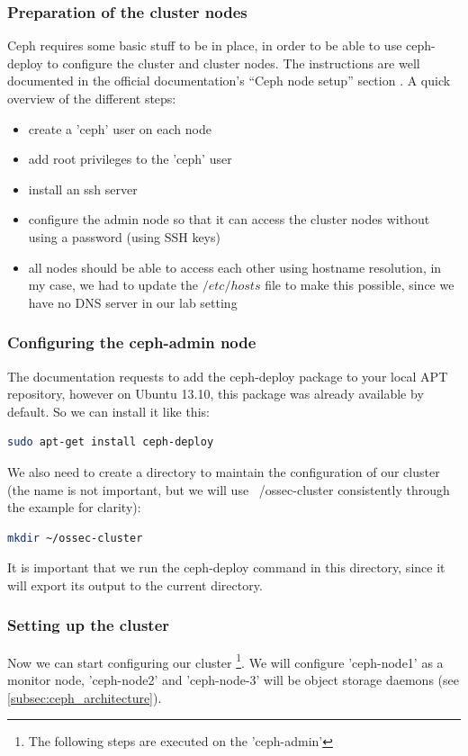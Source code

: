 \documentclass[12pt]{report}
\begin{document}
\subsubsection{Preparation of the cluster nodes}
Ceph requires some basic stuff to be in place, in order to be able to
use ceph-deploy to configure the cluster and cluster nodes.
The instructions are well documented in the official documentation's
``Ceph node setup'' section \cite{ceph_official_doc}.
A quick overview of the different steps:
\begin{itemize}
\item create a 'ceph' user on each node
\item add root privileges to the 'ceph' user
\item install an ssh server
\item configure the admin node so that it can access the cluster nodes
  without using a password (using SSH keys)
\item all nodes should be able to access each other using hostname
  resolution, in my case, we had to update the $/etc/hosts$ file to
  make this possible, since we have no DNS server in our lab setting
\end{itemize}

\subsubsection{Configuring the ceph-admin node}
The documentation requests to add the ceph-deploy package to your
local APT
repository, however on Ubuntu 13.10, this package was already
available by default.
So we can install it like this:
\begin{lstlisting}[language=bash]
sudo apt-get install ceph-deploy
\end{lstlisting}
We also need to create a directory to maintain the configuration of
our cluster (the name is not important, but we will use
~/ossec-cluster consistently through the example for clarity):
\begin{lstlisting}[language=bash]
mkdir ~/ossec-cluster
\end{lstlisting}
It is important that we run  the ceph-deploy command in this
directory, since it will export its output to the current directory.

\subsubsection{Setting up the cluster}
Now we can start configuring our cluster \footnote{The following steps are executed on the 'ceph-admin'}.
We will configure 'ceph-node1' as a monitor node, 'ceph-node2' and
'ceph-node-3' will be object storage daemons (see \cref{subsec:ceph_architecture}).
\end{document}
